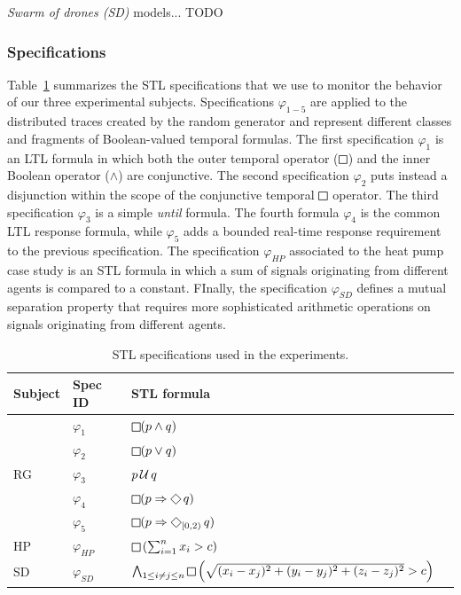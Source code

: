 \noindent \emph{Swarm of drones (SD)} models...
\alert{TODO}

\subsubsection{Specifications}

Table~\ref{tab:spec} summarizes the STL specifications that we use to monitor the behavior of our three experimental subjects. Specifications $\varphi_{1-5}$ are applied to the distributed traces created by the random generator and represent different classes and fragments of Boolean-valued temporal formulas. The first specification $\varphi_1$ is an LTL formula in which both the outer temporal operator ($\LTLg$) and the inner Boolean operator ($\wedge$) are conjunctive. The second specification $\varphi_2$ puts instead a disjunction within the scope of the conjunctive temporal $\LTLg$ operator. The third specification $\varphi_3$ is a simple \emph{until} formula. The fourth formula $\varphi_4$ is the common LTL response formula, while $\varphi_5$ adds a bounded real-time response requirement to the previous specification. The specification $\varphi_{HP}$ associated to the heat pump case study is an STL formula in which a sum of signals originating from different agents is compared to a constant. FInally, the specification $\varphi_{SD}$ defines a mutual separation property that requires more sophisticated arithmetic operations on signals originating from different agents.  

\begin{table}
\centering
\begin{tabular}{|l|l|l|l|}
\hline
Subject & Spec ID & STL formula \\
\hline
\multirow{ 5}{*}{RG}
& $\varphi_1$ & $\LTLg (p \wedge q)$  \\
& $\varphi_2$ & $\LTLg (p \vee q)$ & \\
& $\varphi_3$ & $ p \operatorname{\mathcal{U}} q$ & \\
& $\varphi_4$ & $\LTLg (p \Rightarrow \LTLf q)$ \\
& $\varphi_5$ & $\LTLg (p \Rightarrow \LTLf_{[0,2)} q)$  \\
\hline
HP & $\varphi_{HP}$ & $\LTLg \left(\sum_{i=1}^{n} x_i  > c\right)$  \\
SD & $\varphi_{SD}$ & $\bigwedge_{1 \leq i \neq j \leq n} \LTLg \left( \sqrt{(x_i-x_j)^2 + (y_i-y_j)^2 + (z_i-z_j)^2} > c \right)$   \\
\hline
\end{tabular}
\caption{STL specifications used in the experiments.}
\label{tab:spec} 
\end{table}

